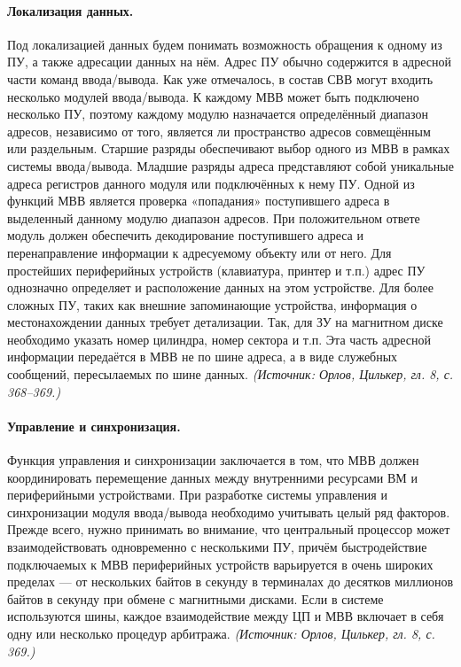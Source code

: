\documentclass[a4paper,12pt]{article}
\begin{document}
\paragraph{Локализация данных.}
Под локализацией данных будем понимать возможность обращения к одному из ПУ, а также адресации данных на нём. Адрес ПУ обычно содержится в адресной части команд ввода/вывода. Как уже отмечалось, в состав СВВ могут входить несколько модулей ввода/вывода. К каждому МВВ может быть подключено несколько ПУ, поэтому каждому модулю назначается определённый диапазон адресов, независимо от того, является ли пространство адресов совмещённым или раздельным. Старшие разряды обеспечивают выбор одного из МВВ в рамках системы ввода/вывода. Младшие разряды адреса представляют собой уникальные адреса регистров данного модуля или подключённых к нему ПУ. Одной из функций МВВ является проверка «попадания» поступившего адреса в выделенный данному модулю диапазон адресов. При положительном ответе модуль должен обеспечить декодирование поступившего адреса и перенаправление информации к адресуемому объекту или от него. Для простейших периферийных устройств (клавиатура, принтер и т.п.) адрес ПУ однозначно определяет и расположение данных на этом устройстве. Для более сложных ПУ, таких как внешние запоминающие устройства, информация о местонахождении данных требует детализации. Так, для ЗУ на магнитном диске необходимо указать номер цилиндра, номер сектора и т.п. Эта часть адресной информации передаётся в МВВ не по шине адреса, а в виде служебных сообщений, пересылаемых по шине данных.
\textit{(Источник: Орлов, Цилькер, гл. 8, с. 368--369.)}

\paragraph{Управление и синхронизация.}
Функция управления и синхронизации заключается в том, что МВВ должен координировать перемещение данных между внутренними ресурсами ВМ и периферийными устройствами. При разработке системы управления и синхронизации модуля ввода/вывода необходимо учитывать целый ряд факторов. Прежде всего, нужно принимать во внимание, что центральный процессор может взаимодействовать одновременно с несколькими ПУ, причём быстродействие подключаемых к МВВ периферийных устройств варьируется в очень широких пределах — от нескольких байтов в секунду в терминалах до десятков миллионов байтов в секунду при обмене с магнитными дисками. Если в системе используются шины, каждое взаимодействие между ЦП и МВВ включает в себя одну или несколько процедур арбитража.
\textit{(Источник: Орлов, Цилькер, гл. 8, с. 369.)}
\end{document}

